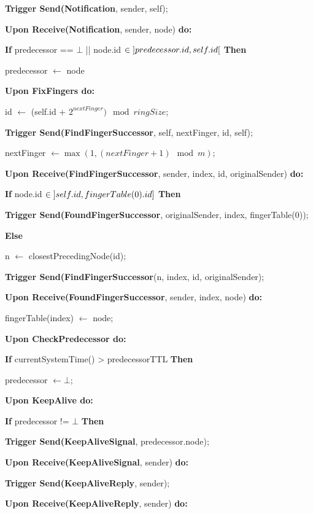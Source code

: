 \documentclass[12pt]{article}
\begin{document}
\qquad \qquad \textbf{Trigger Send(Notification}, sender, self);

\bigbreak
\textbf{Upon Receive(Notification}, sender, node) \textbf{do:}

\qquad \textbf{If} predecessor == $\bot$ || node.id $\in \interval[open]{predecessor.id}{self.id}$ \textbf{Then}

\qquad \qquad predecessor $\leftarrow$ node


\bigbreak
\textbf{Upon FixFingers do:}

\qquad id $\leftarrow$ (self.id + $2^{nextFinger}) \mod{ringSize}$;

\qquad \textbf{Trigger Send(FindFingerSuccessor}, self, nextFinger, id, self);
 
\qquad nextFinger $\leftarrow \max(1, (nextFinger + 1) \mod{m})$;

\bigbreak
\textbf{Upon Receive(FindFingerSuccessor}, sender, index, id, originalSender) \textbf{do:}

\qquad \textbf{If} node.id $\in \interval[open left]{self.id}{fingerTable(0).id}$ 
\textbf{Then}

\qquad \qquad \textbf{Trigger Send(FoundFingerSuccessor}, originalSender, index, fingerTable(0));

\qquad \textbf{Else}

\qquad \qquad n $\leftarrow$ closestPrecedingNode(id);

\qquad \qquad \textbf{Trigger Send(FindFingerSuccessor}(n, index, id, originalSender);


\bigbreak
\textbf{Upon Receive(FoundFingerSuccessor}, sender, index, node) \textbf{do:}

\qquad fingerTable(index) $\leftarrow$ node;

\bigbreak
\textbf{Upon CheckPredecessor do:}

\qquad \textbf{If} currentSystemTime() > predecessorTTL \textbf{Then}

\qquad \qquad predecessor $\leftarrow \bot$;

\bigbreak
\textbf{Upon KeepAlive do:}

\qquad \textbf{If} predecessor != $\bot$ \textbf{Then}

\qquad \qquad \textbf{Trigger Send(KeepAliveSignal}, predecessor.node);

\bigbreak
\textbf{Upon Receive(KeepAliveSignal}, sender) \textbf{do:}

\qquad \textbf{Trigger Send(KeepAliveReply}, sender);

\bigbreak
\textbf{Upon Receive(KeepAliveReply}, sender) \textbf{do:}
\end{document}

